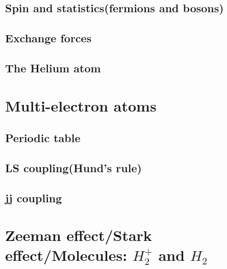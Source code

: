 \documentclass[12pt,a4paper]{article}
\begin{document}
\subsection{Spin and statistics(fermions and bosons)}
\subsection{Exchange forces}
\subsection{The Helium atom}
\section{Multi-electron atoms}
\subsection{Periodic table}
\subsection{LS coupling(Hund's rule)}
\subsection{jj coupling}
\section{Zeeman effect/Stark effect/Molecules: $H^+_2$ and $H_2$}
\end{document}
